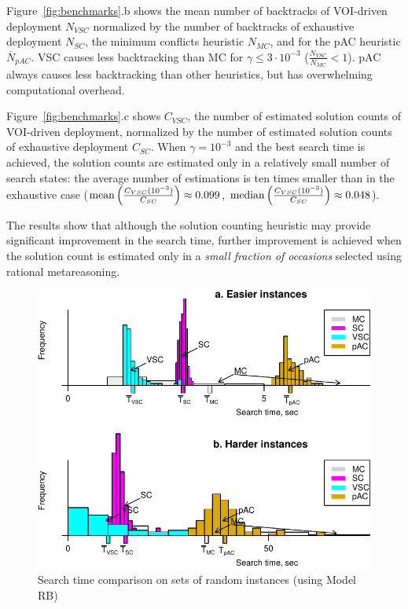 Figure~\ref{fig:benchmarks}.b shows the mean number of backtracks of
VOI-driven deployment $N_{VSC}$ normalized by the
number of backtracks of exhaustive deployment $N_{SC}$,
the minimum conflicts heuristic $N_{MC}$, and for
the pAC heuristic $\overline N_{pAC}$. VSC causes less backtracking
than MC for $\gamma\le 3\cdot10^{-3}$ ($\frac {N_{VSC}}  {N_{MC}} <
1$). pAC always causes less backtracking than other heuristics, but
has overwhelming computational overhead.

Figure~\ref{fig:benchmarks}.c shows $C_{VSC}$, the number of
estimated solution counts of VOI-driven deployment, normalized by the
number of estimated solution counts of exhaustive deployment
$C_{SC}$. When $\gamma=10^{-3}$ and the best search time is achieved,
the solution counts are estimated  only in a relatively small number
of search states: the average number of estimations is ten times smaller than in the
exhaustive case ($\mathop{\mathrm{mean}}\left(\frac {C_{VSC}(10^{-3})}
{C_{SC}}\right)\approx 0.099$, $\mathop{\mathrm{median}}\left(\frac {C_{VSC}(10^{-3})}
{C_{SC}}\right)\approx 0.048$). 

The results show that although the solution counting heuristic
may provide significant improvement in the search time, further improvement is
achieved when the solution count is estimated only in a \emph{small fraction of
occasions} selected using rational metareasoning.

\begin{figure}[h] 
\centering
\includegraphics[scale=0.75]{csp-random-problems-arrows+legend.pdf}
\caption{Search time comparison on sets of random instances (using
  Model RB)}
\label{fig:random-problems}
\end{figure}

